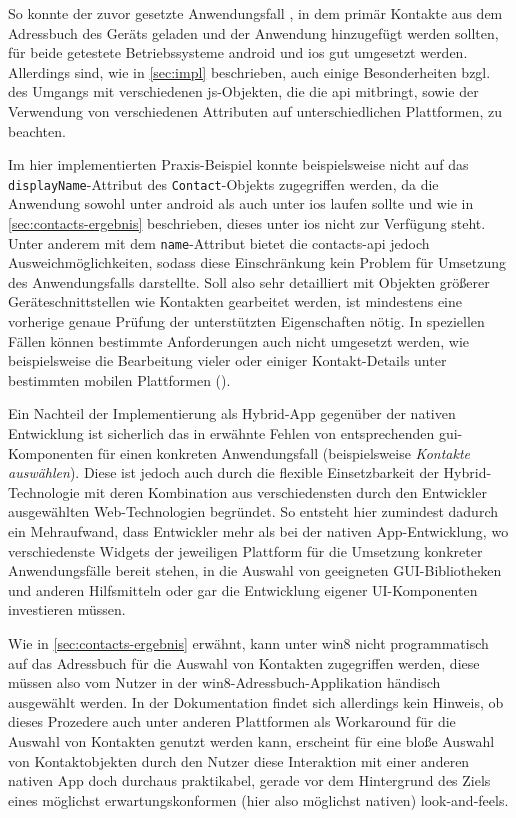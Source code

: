 So konnte der zuvor gesetzte Anwendungsfall , in dem primär Kontakte aus dem Adressbuch des Geräts geladen und der Anwendung hinzugefügt werden sollten, für beide getestete Betriebssysteme \gls{android} und \gls{ios} gut umgesetzt werden. 
Allerdings sind, wie in \autoref{sec:impl} beschrieben, auch einige Besonderheiten bzgl. des Umgangs mit verschiedenen \gls{js}-Objekten, die die \gls{api} mitbringt, sowie der Verwendung von verschiedenen Attributen auf unterschiedlichen Plattformen, zu beachten.

Im hier implementierten Praxis-Beispiel konnte beispielsweise nicht auf das \lstinline|displayName|-Attribut des \lstinline|Contact|-Objekts zugegriffen werden, da die Anwendung sowohl unter \gls{android} als auch unter \gls{ios} laufen sollte und wie in \autoref{sec:contacts-ergebnis} beschrieben, dieses unter \gls{ios} nicht zur Verfügung steht. Unter anderem mit dem \lstinline|name|-Attribut bietet die contacts-api jedoch Ausweichmöglichkeiten, sodass diese Einschränkung kein Problem für Umsetzung des Anwendungsfalls darstellte.
Soll also sehr detailliert mit Objekten größerer Geräteschnittstellen wie \zB Kontakten gearbeitet werden, ist mindestens eine vorherige genaue Prüfung der unterstützten Eigenschaften nötig. In speziellen Fällen können bestimmte Anforderungen auch nicht umgesetzt werden, wie beispielsweise die Bearbeitung vieler oder einiger Kontakt-Details unter bestimmten mobilen Plattformen ().

Ein Nachteil der Implementierung als Hybrid-App gegenüber der nativen Entwicklung ist sicherlich das in  erwähnte Fehlen von entsprechenden \gls{gui}-Komponenten für einen konkreten Anwendungsfall (beispielsweise \emph{Kontakte auswählen}). 
Diese ist jedoch auch durch die flexible Einsetzbarkeit der Hybrid-Technologie mit deren Kombination aus verschiedensten durch den Entwickler ausgewählten Web-Technologien begründet. 
So entsteht hier zumindest dadurch ein Mehraufwand, dass Entwickler mehr als bei der nativen App-Entwicklung, wo verschiedenste Widgets der jeweiligen Plattform für die Umsetzung konkreter Anwendungsfälle bereit stehen, in die Auswahl von geeigneten GUI-Bibliotheken und anderen Hilfsmitteln oder gar die Entwicklung eigener UI-Komponenten investieren müssen.

Wie in \autoref{sec:contacts-ergebnis} erwähnt, kann unter \gls{win8} nicht programmatisch auf das Adressbuch für die Auswahl von Kontakten zugegriffen werden, diese müssen also vom Nutzer in der \gls{win8}-Adressbuch-Applikation händisch ausgewählt werden.
In der Dokumentation findet sich allerdings kein Hinweis, ob dieses Prozedere auch unter anderen Plattformen als Workaround für die Auswahl von Kontakten genutzt werden kann, erscheint für eine bloße Auswahl von Kontaktobjekten durch den Nutzer diese Interaktion mit einer anderen nativen App doch durchaus praktikabel, gerade vor dem Hintergrund des Ziels eines möglichst erwartungskonformen (hier also möglichst nativen) \glspl{look-and-feel}. 

